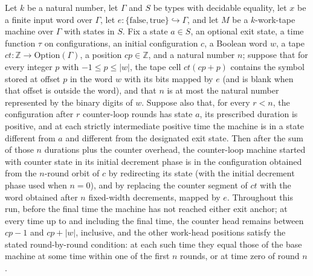 \begin{lemma}
\label{Turing.counter_rounds}
\leanok
{}
Let $k$ be a natural number, let $\Gamma$ and $S$ be types with decidable equality, let
$x$ be a finite input word over $\Gamma$, let
$e:\{\mathrm{false},\mathrm{true}\}\hookrightarrow\Gamma$, and let $M$ be a
$k$-work-tape machine over $\Gamma$ with states in $S$. Fix a state $a\in S$, an
optional exit state, a time function $\tau$ on configurations, an initial configuration
$c$, a Boolean word $w$, a tape $ct:\mathbb Z\to\mathrm{Option}(\Gamma)$, a position
$cp\in\mathbb Z$, and a natural number $n$; suppose that for every integer $p$ with
$-1\le p\le |w|$, the tape cell $ct(cp+p)$ contains the symbol stored at offset $p$ in
the word $w$ with its bits mapped by $e$ (and is blank when that offset is outside the
word), and that $n$ is at most the natural number represented by the binary digits of
$w$. Suppose also that, for every $r<n$, the configuration after $r$ counter-loop rounds
has state $a$, its prescribed duration is positive, and at each strictly intermediate
positive time the machine is in a state different from $a$ and different from the
designated exit state. Then after the sum of those $n$ durations plus the counter
overhead, the counter-loop machine started with counter state in its initial decrement
phase is in the configuration obtained from the $n$-round orbit of $c$ by redirecting
its state (with the initial decrement phase used when $n=0$), and by replacing the
counter segment of $ct$ with the word obtained after $n$ fixed-width decrements, mapped
by $e$. Throughout this run, before the final time the machine has not reached either
exit anchor; at every time up to and including the final time, the counter head remains
between $cp-1$ and $cp+|w|$, inclusive, and the other work-head positions satisfy the
stated round-by-round condition: at each such time they equal those of the base machine
at some time within one of the first $n$ rounds, or at time zero of round $n$.
\end{lemma}

